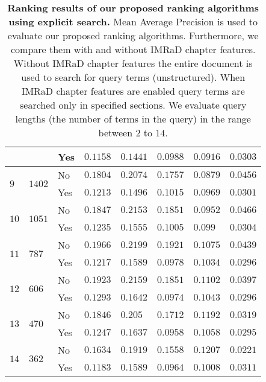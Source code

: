 \begin{table}[h]
\begin{adjustwidth}{-2cm}{}
\begin{tabular}{ C{1cm} C{1cm} C{2.1cm}|C{2.1cm} C{2.1cm} C{2.1cm} C{2.1cm} C{2.1cm} }
                                                    && Yes & $0.1158$ & $0.1441$ & $0.0988$ & $0.0916$ & $0.0303$  \\ \midrule
       &  & No  & $0.1804$ & $0.2074$ & $0.1757$ & $0.0879$ & $0.0456$  \\
                                                    && Yes & $0.1213$ & $0.1496$ & \color{Plum}$\mathbf{0.1015}$ & $0.0969$ & $0.0301$  \\ \midrule
       &  & No & $0.1847$ & $0.2153$ & $0.1851$ & $0.0952$ & $0.0466$  \\
                                                    && Yes & $0.1235$ & $0.1555$ & $0.1005$ & $0.099$  & $0.0304$  \\ \midrule
       &  & No  & \color{blue}$\mathbf{0.1966}$ & \color{blue}$\mathbf{0.2199}$ & \color{blue}$\mathbf{0.1921}$ & $0.1075$ & $0.0439$  \\
                                                    && Yes & $0.1217$ & $0.1589$ & $0.0978$ & $0.1034$ & $0.0296$  \\ \midrule
       &  & No  & $0.1923$ & $0.2159$ & $0.1851$ & $0.1102$ & $0.0397$  \\
                                                    && Yes & \color{Plum}$\mathbf{0.1293}$ & \color{Plum}$\mathbf{0.1642}$ & $0.0974$ & $0.1043$ & $0.0296$  \\ \midrule
       &  & No  & $0.1846$ & $0.205$ & $0.1712$ & $0.1192$ & $0.0319$   \\
                                                    && Yes & $0.1247$ & $0.1637$ & $0.0958$ & \color{Plum}$\mathbf{0.1058}$ & $0.0295$  \\ \midrule
       &  & No  & $0.1634$ & $0.1919$ & $0.1558$ & \color{blue}$\mathbf{0.1207}$ & $0.0221$  \\
                                                    && Yes & $0.1183$ & $0.1589$ & $0.0964$ & $0.1008$ & $0.0311$  \\
      \bottomrule
    \end{tabular}
  \caption[Ranking results with explicit search]{\textbf{Ranking results of our proposed ranking algorithms using explicit search.} Mean Average Precision is used to evaluate our proposed ranking algorithms. Furthermore, we compare them with and without IMRaD chapter features. Without IMRaD chapter features the entire document is used to search for query terms (unstructured). When IMRaD chapter features are enabled query terms are searched only in specified sections. We evaluate query lengths (the number of terms in the query) in the range between $2$ to $14$.}
  \label{tbl:ranking_result_explicit}
  \end{adjustwidth}
\end{table}
\clearpage

